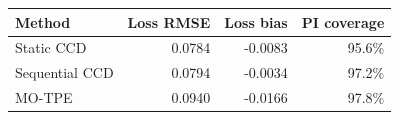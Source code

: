 \begin{tabular}{lrrr}
\toprule
Method & Loss RMSE & Loss bias & PI coverage \\
\midrule
Static CCD & 0.0784 & -0.0083 & 95.6\% \\
Sequential CCD & 0.0794 & -0.0034 & 97.2\% \\
MO-TPE & 0.0940 & -0.0166 & 97.8\% \\
\bottomrule
\end{tabular}
